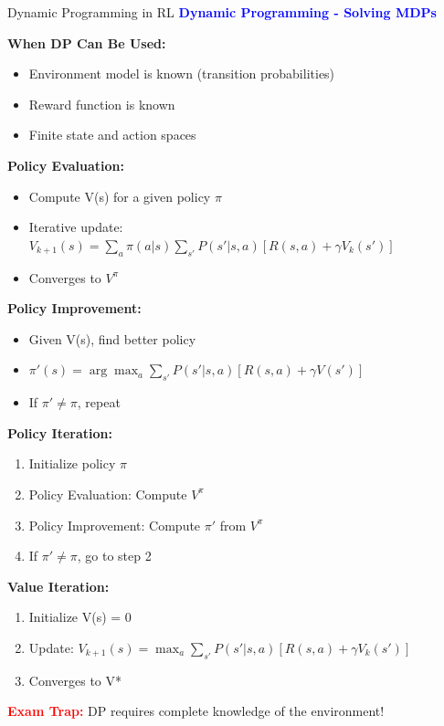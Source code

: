 \documentclass[8pt]{beamer}
\begin{document}
\begin{frame}{Dynamic Programming in RL}
\fontsize{6.5}{7.5}\selectfont
\textcolor{blue}{\textbf{Dynamic Programming - Solving MDPs}}

\textbf{When DP Can Be Used:}
\begin{itemize}
\item Environment model is known (transition probabilities)
\item Reward function is known
\item Finite state and action spaces
\end{itemize}

\textbf{Policy Evaluation:}
\begin{itemize}
\item Compute V(s) for a given policy $\pi$
\item Iterative update: $V_{k+1}(s) = \sum_a \pi(a|s) \sum_{s'} P(s'|s,a)[R(s,a) + \gamma V_k(s')]$
\item Converges to $V^\pi$
\end{itemize}

\textbf{Policy Improvement:}
\begin{itemize}
\item Given V(s), find better policy
\item $\pi'(s) = \arg\max_a \sum_{s'} P(s'|s,a)[R(s,a) + \gamma V(s')]$
\item If $\pi' \neq \pi$, repeat
\end{itemize}

\textbf{Policy Iteration:}
\begin{enumerate}
\item Initialize policy $\pi$
\item Policy Evaluation: Compute $V^\pi$
\item Policy Improvement: Compute $\pi'$ from $V^\pi$
\item If $\pi' \neq \pi$, go to step 2
\end{enumerate}

\textbf{Value Iteration:}
\begin{enumerate}
\item Initialize V(s) = 0
\item Update: $V_{k+1}(s) = \max_a \sum_{s'} P(s'|s,a)[R(s,a) + \gamma V_k(s')]$
\item Converges to V*
\end{enumerate}

\textcolor{red}{\textbf{Exam Trap:}} DP requires complete knowledge of the environment!
\end{frame}
\end{document}
